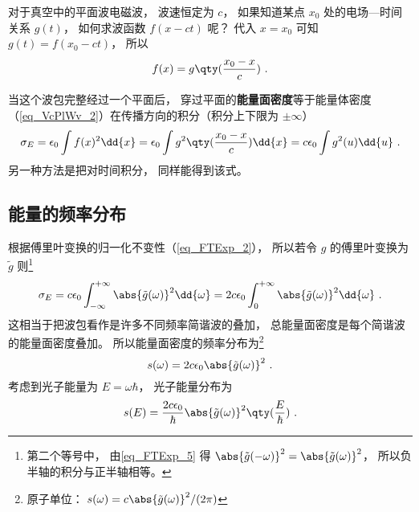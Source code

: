 

对于真空中的平面波电磁波， 波速恒定为 $c$， 如果知道某点 $x_0$ 处的电场—时间关系 $g(t)$， 如何求波函数 $f(x - ct)$ 呢？ 代入 $x = x_0$ 可知 $g(t) = f(x_0 - ct)$， 所以
\begin{equation}
f(x) = g\qty(\frac{x_0 - x}{c})~.
\end{equation}

当这个波包完整经过一个平面后， 穿过平面的\textbf{能量面密度}等于能量体密度（\autoref{eq_VcPlWv_2}）在传播方向的积分（积分上下限为 $\pm\infty$）
\begin{equation}\label{eq_WpEng_1}
\sigma_E = \epsilon_0 \int f(x)^2 \dd{x} = \epsilon_0  \int g^2\qty(\frac{x_0 - x}{c}) \dd{x} = c\epsilon_0 \int g^2(u) \dd{u}~.
\end{equation}
另一种方法是把对时间积分， 同样能得到该式。

\subsection{能量的频率分布}
根据傅里叶变换的归一化不变性（\autoref{eq_FTExp_2}）， 所以若令 $g$ 的傅里叶变换为 $\tilde g$ 则\footnote{第二个等号中， 由\autoref{eq_FTExp_5} 得 $\abs{\tilde g(-\omega)}^2 = \abs{\tilde g(\omega)}^2$， 所以负半轴的积分与正半轴相等。}
\begin{equation}
\sigma_E = c\epsilon_0 \int_{-\infty}^{+\infty} \abs{\tilde g(\omega)}^2 \dd{\omega} = 2c\epsilon_0 \int_{0}^{+\infty} \abs{\tilde g(\omega)}^2 \dd{\omega}~.
\end{equation}
这相当于把波包看作是许多不同频率简谐波的叠加， 总能量面密度是每个简谐波的能量面密度叠加。 所以能量面密度的频率分布为\footnote{原子单位： $s(\omega) = c \abs{\tilde g(\omega)}^2/(2\pi)$}
\begin{equation}\label{eq_WpEng_3}
s(\omega) = 2c\epsilon_0 \abs{\tilde g(\omega)}^2~.
\end{equation}
考虑到光子能量为 $E = \omega\hbar$， 光子能量分布为
\begin{equation}\label{eq_WpEng_2}
s(E) = \frac{2c\epsilon_0}{\hbar} \abs{\tilde g(\omega)}^2 \qty(\frac{E}{\hbar})~.
\end{equation}

